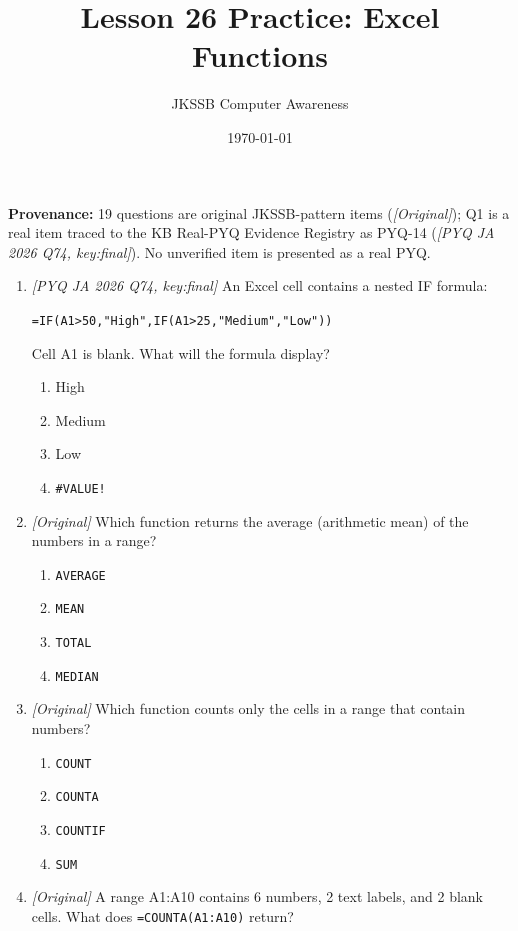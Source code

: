 \documentclass[11pt]{article}
\title{Lesson 26 Practice: Excel Functions}
\author{JKSSB Computer Awareness}
\date{\today}
\begin{document}
\maketitle
\noindent\textbf{Provenance:} 19 questions are original JKSSB-pattern items
(\textit{[Original]}); Q1 is a real item traced to the KB Real-PYQ Evidence
Registry as PYQ-14 (\textit{[PYQ JA 2026 Q74, key:final]}). No unverified item
is presented as a real PYQ.

\begin{enumerate}[label=\textbf{Q\arabic*.}, leftmargin=*]
\item \textit{[PYQ JA 2026 Q74, key:final]} An Excel cell contains a nested IF
  formula:
  \begin{center}
    \texttt{=IF(A1>50,"High",IF(A1>25,"Medium","Low"))}
  \end{center}
  Cell A1 is blank. What will the formula display? 
  \begin{enumerate}[label=\Alph*.]
    \item High
    \item Medium
    \item Low
    \item \texttt{\#VALUE!}
  \end{enumerate}
\item \textit{[Original]} Which function returns the average (arithmetic mean)
  of the numbers in a range?
  \begin{enumerate}[label=\Alph*.]
    \item \texttt{AVERAGE}
    \item \texttt{MEAN}
    \item \texttt{TOTAL}
    \item \texttt{MEDIAN}
  \end{enumerate}
\item \textit{[Original]} Which function counts only the cells in a range that
  contain numbers?
  \begin{enumerate}[label=\Alph*.]
    \item \texttt{COUNT}
    \item \texttt{COUNTA}
    \item \texttt{COUNTIF}
    \item \texttt{SUM}
  \end{enumerate}
\item \textit{[Original]} A range A1:A10 contains 6 numbers, 2 text labels,
  and 2 blank cells. What does \texttt{=COUNTA(A1:A10)} return?
  \begin{enumerate}[label=\Alph*.]

\end{enumerate}
\end{enumerate}
\end{document}
